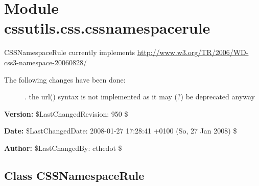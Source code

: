 %
%
%


\section{Module cssutils.css.cssnamespacerule}

    \label{cssutils:css:cssnamespacerule}

CSSNamespaceRule currently implements
\href{http://www.w3.org/TR/2006/WD-css3-namespace-20060828/}{http://www.w3.org/TR/2006/WD-css3-namespace-20060828/}
\begin{description}
\item[{The following changes have been done:}] . the url() syntax is not implemented as it may (?) be deprecated
anyway

\end{description}
\textbf{Version:} \$LastChangedRevision: 950 \$



\textbf{Date:} \$LastChangedDate: 2008-01-27 17:28:41 +0100 (So, 27 Jan 2008) \$



\textbf{Author:} \$LastChangedBy: cthedot \$





\subsection{Class CSSNamespaceRule}

